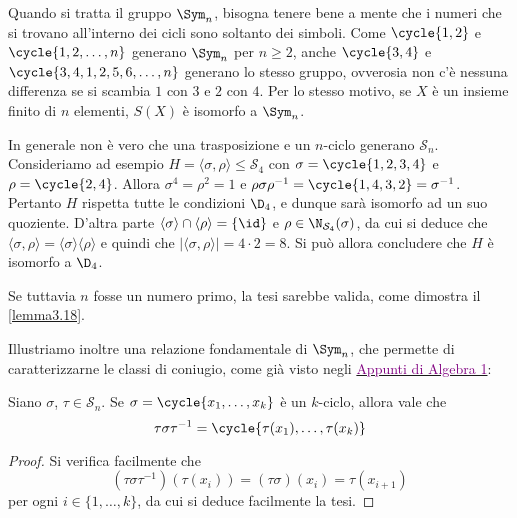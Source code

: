 \documentclass[11pt]{scrartcl}
\begin{document}
	\begin{remark}
		Quando si tratta il gruppo $\Sym_n$, bisogna tenere bene a mente che i numeri
		che si trovano all'interno dei cicli sono soltanto dei simboli. Come
		$\cycle{1, 2}$ e $\cycle{1, 2, \ldots, n}$ generano $\Sym_n$ per $n \geq 2$,
		anche $\cycle{3, 4}$ e $\cycle{3, 4, 1, 2, 5, 6, \ldots, n}$ generano lo stesso gruppo,
		ovverosia non c'è nessuna differenza se si scambia $1$ con $3$ e $2$ con $4$.
		Per lo stesso motivo, se $X$ è un insieme finito di $n$ elementi, $S(X)$ è
		isomorfo a $\Sym_n$.
	\end{remark}
	
	\begin{remark}
		In generale non è vero che una trasposizione e un $n$-ciclo generano $\mathcal{S}_n$.
		Consideriamo ad esempio $H = \langle\sigma, \rho\rangle\leqslant \mathcal{S}_4$ con
		$\sigma = \cycle{1, 2, 3, 4}$ e $\rho = \cycle{2, 4}$. Allora
		$\sigma^4 = \rho^2 = 1$ e $\rho\sigma\rho^{-1} = \cycle{1, 4, 3, 2} =
		\sigma^{-1}$. Pertanto $H$ rispetta tutte le condizioni $\D_4$, e dunque sarà
		isomorfo ad un suo quoziente. D'altra parte $\langle\sigma\rangle\cap \langle\rho\rangle = \{\id\}$
		e $\rho \in \N_{\mathcal{S}_4}(\sigma)$, da cui si deduce che $\langle\sigma, \rho\rangle =
		\langle\sigma\rangle\langle\rho\rangle$ e quindi che $\lvert \langle\sigma, \rho\rangle\rvert = 4 \cdot 2 = 8$. Si può allora concludere che
		$H$ è isomorfo a $\D_4$. \medskip
		
		
		Se tuttavia $n$ fosse un numero primo, la tesi sarebbe valida, come dimostra il
		\autoref{lemma3.18}. 
	\end{remark}
	
	Illustriamo inoltre una relazione fondamentale di $\Sym_n$, che permette di
	caratterizzarne le classi di coniugio, come già visto negli \href{https://github.com/diego-unipi/Algebra-1}{\textcolor{purple}{Appunti di Algebra 1}}:
	
	\begin{lemma}
		\label{lemma1.56}
		Siano $\sigma$, $\tau \in \mathcal{S}_n$. Se $\sigma = \cycle{x_1, \ldots, x_k}$ è un 
		$k$-ciclo, allora vale che
		\[
		\tau\sigma\tau^{-1} = \cycle{\tau(x_1),\ldots, \tau(x_k)}
		\]
	\end{lemma}
	
	\begin{proof}
		Si verifica facilmente che
		\[
		(\tau\sigma\tau^{-1})(\tau(x_i)) = (\tau\sigma)(x_i) = \tau(x_{i + 1})
		\]per ogni $i \in \{1, \ldots, k\}$, da cui si deduce facilmente la tesi.
	\end{proof}
	
\end{document}
